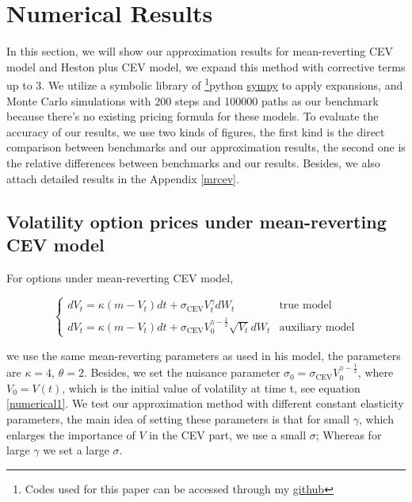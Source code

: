 \chapter{Numerical Results}

In this section, we will show our approximation results for mean-reverting CEV model and Heston plus CEV model, we expand this method with corrective terms up to 3. We utilize a symbolic library of \footnote{Codes used for this paper can be accessed through my \href{https://github.com/ywang408/master-thesis-code}{github}}{python} \href{https://www.sympy.org/en/index.html}{sympy} to apply expansions, and Monte Carlo simulations with 200 steps and 100000 paths as our benchmark because there's no existing pricing formula for these models. To evaluate the accuracy of our results, we use two kinds of figures, the first kind is the direct comparison between benchmarks and our approximation results, the second one is the relative differences between benchmarks and our results. Besides, we also attach detailed results in the Appendix \ref{mrcev}.

\section{Volatility option prices under mean-reverting CEV model}

For options under mean-reverting CEV model,

\begin{equation}\label{numerical1}
  \begin{cases}
    d V_t=\kappa(m - V_t) d t+\sigma_{\text{CEV}} V^{\gamma}_t d W_t &\text{true model}\\
    d V_t=\kappa(m - V_t) d t+\sigma_{\text{CEV}}V_0^{\gamma-\frac{1}{2}} \sqrt{V_t} d W_t &\text{auxiliary model}
  \end{cases}
\end{equation}

\noindent we use the same mean-reverting parameters as \cite{grunbichler_valuing_1996} used in his model, the parameters are $\kappa=4$, $\theta=2$. Besides, we set the nuisance parameter $\sigma_0 = \sigma_{\text{CEV}} V_0^{\gamma-\frac{1}{2}}$, where $V_0=V(t)$, which is the initial value of volatility at time t, see equation \eqref{numerical1}. We test our approximation method with different constant elasticity parameters, the main idea of setting these parameters is that for small $\gamma$, which enlarges the importance of $V$ in the CEV part, we use a small $\sigma$; Whereas for large $\gamma$ we set a large $\sigma$. 

